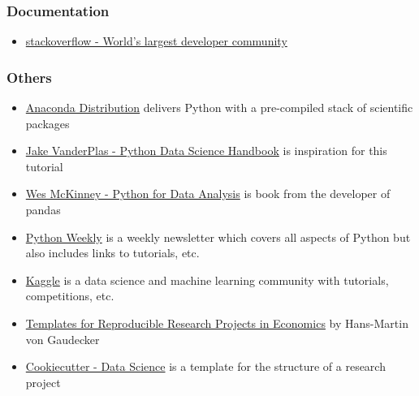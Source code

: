 \begin{frame}[c]\frametitle{Documentation}
\begin{itemize}
    \item \href{https://stackoverflow.com/}{stackoverflow - World's largest developer community}
\end{itemize}
\end{frame}

\begin{frame}[c]\frametitle{Others}
\begin{itemize}
    \item \href{https://www.anaconda.com/download/}{Anaconda Distribution} delivers Python with a pre-compiled stack of scientific packages
    \item \href{https://jakevdp.github.io/PythonDataScienceHandbook/}{Jake VanderPlas - Python Data Science Handbook} is inspiration for this tutorial
    \item \href{https://www.amazon.de/Python-Data-Analysis-Wrangling-IPython/dp/1491957662/}{Wes McKinney - Python for Data Analysis} is book from the developer of pandas
    \item \href{https://www.pythonweekly.com/}{Python Weekly} is a weekly newsletter which covers all aspects of Python but also includes links to tutorials, etc.
    \item \href{https://www.kaggle.com/}{Kaggle} is a data science and machine learning community with tutorials, competitions, etc.
    \item \href{https://github.com/hmgaudecker/econ-project-templates}{Templates for Reproducible Research Projects in Economics} by Hans-Martin von Gaudecker
    \item \href{https://drivendata.github.io/cookiecutter-data-science/}{Cookiecutter - Data Science} is a template for the structure of a research project
\end{itemize}
\end{frame}
